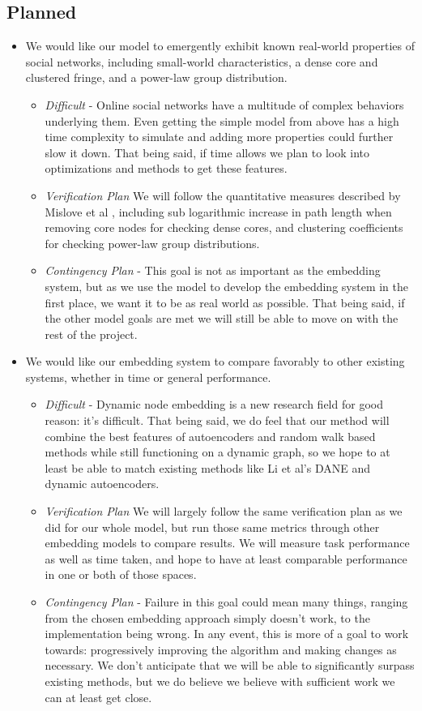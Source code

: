 \documentclass[10pt]{article}
\begin{document}
\subsection{Planned}
\begin{itemize}
\item We would like our model to emergently exhibit known real-world properties of social networks, including small-world characteristics, a dense core and clustered fringe, and a power-law group distribution.
\begin{itemize}
\item \textit{Difficult} - Online social networks have a multitude of complex behaviors underlying them. Even getting the simple model from above has a high time complexity to simulate and adding more properties could further slow it down. That being said, if time allows we plan to look into optimizations and methods to get these features. 
\item \textit{Verification Plan} We will follow the quantitative measures described by Mislove et al \cite{mislove2007measurement}, including sub logarithmic increase in path length when removing core nodes for checking dense cores, and clustering coefficients for checking power-law group distributions. 
\item \textit{Contingency Plan} - This goal is not as important as the embedding system, but as we use the model to develop the embedding system in the first place, we want it to be as real world as possible. That being said, if the other model goals are met we will still be able to move on with the rest of the project. 
\end{itemize}
\item We would like our embedding system to compare favorably to other existing systems, whether in time or general performance. 
\begin{itemize}
\item \textit{Difficult} - Dynamic node embedding is a new research field for good reason: it's difficult. That being said, we do feel that our method will combine the best features of autoencoders and random walk based methods while still functioning on a dynamic graph, so we hope to at least be able to match existing methods like Li et al's DANE and dynamic autoencoders. 
\item \textit{Verification Plan} We will largely follow the same verification plan as we did for our whole model, but run those same metrics through other embedding models to compare results. We will measure task performance as well as time taken, and hope to have at least comparable performance in one or both of those spaces.  
\item \textit{Contingency Plan} - Failure in this goal could mean many things, ranging from the chosen embedding approach simply doesn't work, to the implementation being wrong. In any event, this is more of a goal to work towards: progressively improving the algorithm and making changes as necessary. We don't anticipate that we will be able to significantly surpass existing methods, but we do believe we believe with sufficient work we can at least get close. 
\end{itemize}

\end{itemize}
\end{document}
